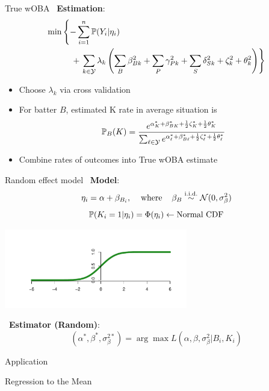 \documentclass{beamer}
\def\Y{\mathcal Y}\def\Z{\mathcal Z}
\def\l{\left}\def\r{\right}\def\lf{\lfloor}\def\rf{\rfloor}
\def\iid{\stackrel{\mbox{\scriptsize i.i.d.}}{\sim}}
\begin{document}
\begin{frame}{True wOBA}
~{\bf Estimation}:
\begin{align*}
\min&\l\{-\sum_{i=1}^n\mP(Y_i|\eta_i)\r.\\
    &\hspace{4mm} + \l.\sum_{k\in\Y}\lambda_k\l(\sum_B\beta_{Bk}^2
    + \sum_P\gamma_{Pk}^2 + \sum_S\delta_{Sk}^2 + \zeta_k^2 + \theta_k^2\r)\r\}
\end{align*}
\begin{itemize}
    \item Choose $\lambda_k$ via cross validation
    \item For batter $B$, estimated K rate in average situation is
    $$\mP_B(K) = \frac{e^{\alpha^*_K + \beta^*_{BK} + \frac12\zeta^*_K +
    \frac12\theta^*_K}}{\sum_{\ell\in\Y}e^{\alpha^*_\ell + \beta^*_{B\ell} +
    \frac12\zeta^*_\ell + \frac12\theta^*_\ell}}$$
    \item Combine rates of outcomes into True wOBA estimate
\end{itemize}
\end{frame}

\begin{frame}{Random effect model}
~{\bf Model}:
$$\eta_i = \alpha + \beta_{B_i}, \hspace{4mm}\mbox{where}\hspace{4mm}
\beta_B \iid \N(0, \sigma^2_\beta)$$
$$\mathbb P(K_i = 1|\eta_i) = \Phi(\eta_i) \leftarrow \mbox{Normal CDF}$$
\begin{center}
\includegraphics[width = 0.6\textwidth]{../figs/normalcdf.pdf}
\end{center}
~{\bf Estimator (Random)}:
$$(\alpha^*, \beta^*, \sigma^{2*}_\beta) =
    \arg\max L(\alpha, \beta, \sigma^2_\beta|B_i, K_i)$$
\end{frame}

\begin{frame}
\centering\Huge Application
\end{frame}

\begin{frame}
\centering\LARGE Regression to the Mean
\end{frame}
\end{document}

